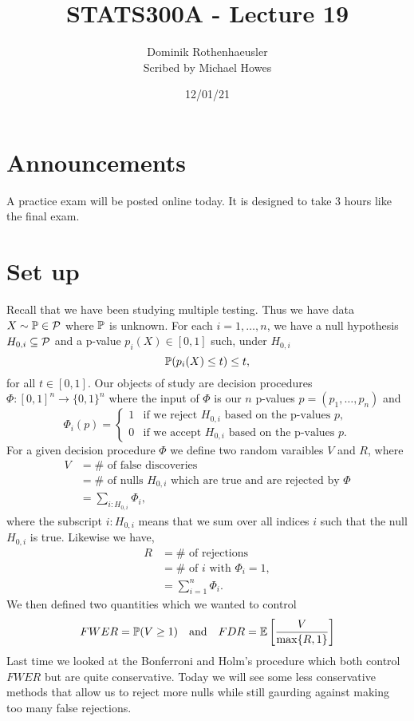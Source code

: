 




\title{STATS300A - Lecture 19}
\author{Dominik Rothenhaeusler\\ Scribed by Michael Howes}
\date{12/01/21}

\pagestyle{fancy}
\fancyhf{}


\maketitle
\tableofcontents
\section{Announcements}
A practice exam will be posted online today. It is designed to take 3 hours like the final exam.
\section{Set up}
Recall that we have been studying multiple testing. Thus we have data $X \sim {\mathbb{P}} \in {\mathcal{P}}$ where ${\mathbb{P}}$ is unknown. For each $i=1,\ldots,n$, we have a null hypothesis $H_{0,i} \subseteq {\mathcal{P}}$ and a p-value $p_i(X) \in [0,1]$ such, under $H_{0,i}$
\[{\mathbb{P}}(p_i(X) \le t) \le t, \]
for all $t \in [0,1]$. Our objects of study are decision procedures $\Phi : [0,1]^n \to \{0,1\}^n$ where the input of $\Phi$ is our $n$ p-values $p= (p_1,\ldots,p_n)$ and 
\[\Phi_i(p) = \begin{cases}
    1 & \text{if we reject $H_{0,i}$ based on the p-values $p$},\\
    0 & \text{if we accept $H_{0,i}$ based on the p-values $p$}.
\end{cases} \]
For a given decision procedure $\Phi$ we define two random varaibles $V$ and $R$, where
\begin{align*}
    V &= \# \text{ of false discoveries}\\
    &=\# \text{ of nulls $H_{0,i}$ which are true and are rejected by $\Phi$}\\
    &=\sum_{i:H_{0,i}}\Phi_i,
\end{align*}
where the subscript ${i\!:\!H_{0,i}}$ means that we sum over all indices $i$ such that the null $H_{0,i}$ is true. Likewise we have,
\begin{align*}
    R&=\# \text{ of rejections}\\
    &=\# \text{ of $i$ with $\Phi_i=1$},\\
    &=\sum_{i=1}^n \Phi_i.
\end{align*}
We then defined two quantities which we wanted to control
\[FWER = {\mathbb{P}}(V \ge 1) ~~~\text{and}~~~ FDR = {\mathbb{E}}\left[\frac{V}{\max\{R,1\}}\right] \]
Last time we looked at the Bonferroni and Holm's procedure which both control $FWER$ but are quite conservative. Today we will see some less conservative methods that allow us to reject more nulls while still gaurding against making too many false rejections. 



